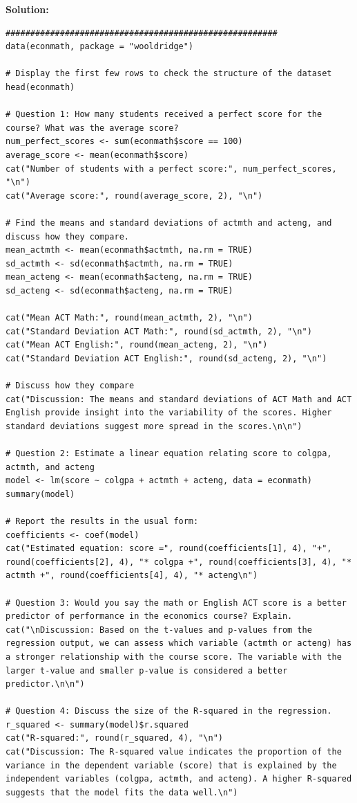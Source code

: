\documentclass[12pt]{article}
\begin{document}
\begin{enumerate}
{\color{blue}
\noindent \textbf{Solution:}

\begin{lstlisting}
#######################################################
data(econmath, package = "wooldridge")

# Display the first few rows to check the structure of the dataset
head(econmath)

# Question 1: How many students received a perfect score for the course? What was the average score?
num_perfect_scores <- sum(econmath$score == 100)
average_score <- mean(econmath$score)
cat("Number of students with a perfect score:", num_perfect_scores, "\n")
cat("Average score:", round(average_score, 2), "\n")

# Find the means and standard deviations of actmth and acteng, and discuss how they compare.
mean_actmth <- mean(econmath$actmth, na.rm = TRUE)
sd_actmth <- sd(econmath$actmth, na.rm = TRUE)
mean_acteng <- mean(econmath$acteng, na.rm = TRUE)
sd_acteng <- sd(econmath$acteng, na.rm = TRUE)

cat("Mean ACT Math:", round(mean_actmth, 2), "\n")
cat("Standard Deviation ACT Math:", round(sd_actmth, 2), "\n")
cat("Mean ACT English:", round(mean_acteng, 2), "\n")
cat("Standard Deviation ACT English:", round(sd_acteng, 2), "\n")

# Discuss how they compare
cat("Discussion: The means and standard deviations of ACT Math and ACT English provide insight into the variability of the scores. Higher standard deviations suggest more spread in the scores.\n\n")

# Question 2: Estimate a linear equation relating score to colgpa, actmth, and acteng
model <- lm(score ~ colgpa + actmth + acteng, data = econmath)
summary(model)

# Report the results in the usual form:
coefficients <- coef(model)
cat("Estimated equation: score =", round(coefficients[1], 4), "+", round(coefficients[2], 4), "* colgpa +", round(coefficients[3], 4), "* actmth +", round(coefficients[4], 4), "* acteng\n")

# Question 3: Would you say the math or English ACT score is a better predictor of performance in the economics course? Explain.
cat("\nDiscussion: Based on the t-values and p-values from the regression output, we can assess which variable (actmth or acteng) has a stronger relationship with the course score. The variable with the larger t-value and smaller p-value is considered a better predictor.\n\n")

# Question 4: Discuss the size of the R-squared in the regression.
r_squared <- summary(model)$r.squared
cat("R-squared:", round(r_squared, 4), "\n")
cat("Discussion: The R-squared value indicates the proportion of the variance in the dependent variable (score) that is explained by the independent variables (colgpa, actmth, and acteng). A higher R-squared suggests that the model fits the data well.\n")


\end{lstlisting}

}



\end{enumerate}
\end{document}

